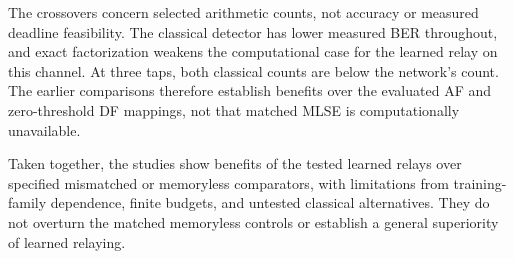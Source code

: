 The crossovers concern selected arithmetic counts, not accuracy or measured deadline feasibility. The classical detector has lower measured BER throughout, and exact factorization weakens the computational case for the learned relay on this channel. At three taps, both classical counts are below the network's count. The earlier comparisons therefore establish benefits over the evaluated AF and zero-threshold DF mappings, not that matched MLSE is computationally unavailable.

Taken together, the studies show benefits of the tested learned relays over specified mismatched or memoryless comparators, with limitations from training-family dependence, finite budgets, and untested classical alternatives. They do not overturn the matched memoryless controls or establish a general superiority of learned relaying.
